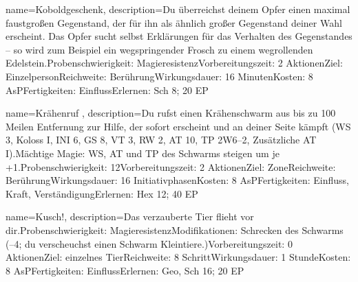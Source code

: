 {
    name={Koboldgeschenk},
    description={Du überreichst deinem Opfer einen maximal faustgroßen Gegenstand, der für ihn als ähnlich großer Gegenstand deiner Wahl erscheint. Das Opfer sucht selbst Erklärungen für das Verhalten des Gegenstandes – so wird zum Beispiel ein wegspringender Frosch zu einem wegrollenden Edelstein.\newline Probenschwierigkeit: Magieresistenz\newline Vorbereitungszeit: 2 Aktionen\newline Ziel: Einzelperson\newline Reichweite: Berührung\newline Wirkungsdauer: 16 Minuten\newline Kosten: 8 AsP\newline Fertigkeiten: Einfluss\newline Erlernen: Sch 8; 20 EP}
}


{
    name={Krähenruf },
    description={Du rufst einen Krähenschwarm aus bis zu 100 Meilen Entfernung zur Hilfe, der sofort erscheint und an deiner Seite kämpft (WS 3, Koloss I, INI 6, GS 8, VT 3, RW 2, AT 10, TP 2W6–2, Zusätzliche AT I).\newline Mächtige Magie: WS, AT und TP des Schwarms steigen um je +1.\newline Probenschwierigkeit: 12\newline Vorbereitungszeit: 2 Aktionen\newline Ziel: Zone\newline Reichweite: Berührung\newline Wirkungsdauer: 16 Initiativphasen\newline Kosten: 8 AsP\newline Fertigkeiten: Einfluss, Kraft, Verständigung\newline Erlernen: Hex 12; 40 EP}
}


{
    name={Kusch!},
    description={Das verzauberte Tier flieht vor dir.\newline Probenschwierigkeit: Magieresistenz\newline Modifikationen: Schrecken des Schwarms (–4; du verscheuchst einen Schwarm Kleintiere.)\newline Vorbereitungszeit: 0 Aktionen\newline Ziel: einzelnes Tier\newline Reichweite: 8 Schritt\newline Wirkungsdauer: 1 Stunde\newline Kosten: 8 AsP\newline Fertigkeiten: Einfluss\newline Erlernen: Geo, Sch 16; 20 EP}
}


